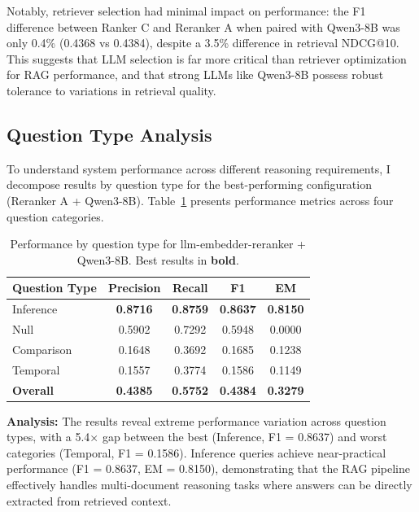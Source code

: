 \documentclass[10pt,twocolumn]{article}
\begin{document}
Notably, retriever selection had minimal impact on performance: the F1 difference between Ranker C and Reranker A when paired with Qwen3-8B was only 0.4\% (0.4368 vs 0.4384), despite a 3.5\% difference in retrieval NDCG@10. This suggests that LLM selection is far more critical than retriever optimization for RAG performance, and that strong LLMs like Qwen3-8B possess robust tolerance to variations in retrieval quality.

\subsection{Question Type Analysis}

To understand system performance across different reasoning requirements, I decompose results by question type for the best-performing configuration (Reranker A + Qwen3-8B). Table~\ref{tab:question_type} presents performance metrics across four question categories.

\begin{table}[h]
    \centering
    \caption{Performance by question type for llm-embedder-reranker + Qwen3-8B. Best results in \textbf{bold}.}
    \label{tab:question_type}
    \footnotesize
    \setlength{\tabcolsep}{6pt}
    \begin{tabular}{lcccc}
        \toprule
        \textbf{Question Type} & \textbf{Precision} & \textbf{Recall} & \textbf{F1}     & \textbf{EM}     \\
        \midrule
        Inference              & \textbf{0.8716}    & \textbf{0.8759} & \textbf{0.8637} & \textbf{0.8150} \\
        Null                   & 0.5902             & 0.7292          & 0.5948          & 0.0000          \\
        Comparison             & 0.1648             & 0.3692          & 0.1685          & 0.1238          \\
        Temporal               & 0.1557             & 0.3774          & 0.1586          & 0.1149          \\
        \midrule
        \textbf{Overall}       & \textbf{0.4385}    & \textbf{0.5752} & \textbf{0.4384} & \textbf{0.3279} \\
        \bottomrule
    \end{tabular}
\end{table}

\textbf{Analysis:} The results reveal extreme performance variation across question types, with a 5.4× gap between the best (Inference, F1 = 0.8637) and worst categories (Temporal, F1 = 0.1586). Inference queries achieve near-practical performance (F1 = 0.8637, EM = 0.8150), demonstrating that the RAG pipeline effectively handles multi-document reasoning tasks where answers can be directly extracted from retrieved context.
\end{document}
